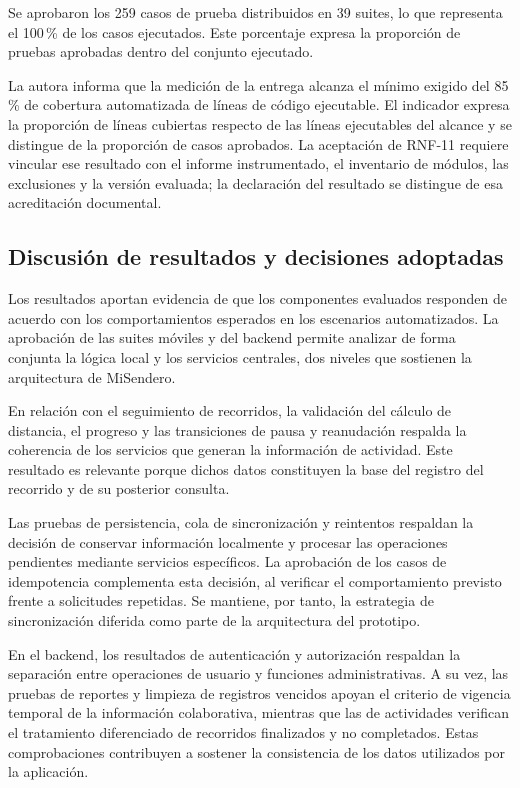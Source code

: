 Se aprobaron los 259 casos de prueba distribuidos en 39 suites, lo que representa el 100\,\% de los casos ejecutados. Este porcentaje expresa la proporción de pruebas aprobadas dentro del conjunto ejecutado.

La autora informa que la medición de la entrega alcanza el mínimo exigido del 85\,\% de cobertura automatizada de líneas de código ejecutable. El indicador expresa la proporción de líneas cubiertas respecto de las líneas ejecutables del alcance y se distingue de la proporción de casos aprobados. La aceptación de RNF-11 requiere vincular ese resultado con el informe instrumentado, el inventario de módulos, las exclusiones y la versión evaluada; la declaración del resultado se distingue de esa acreditación documental.

\subsection{Discusión de resultados y decisiones adoptadas}

Los resultados aportan evidencia de que los componentes evaluados responden de acuerdo con los comportamientos esperados en los escenarios automatizados. La aprobación de las suites móviles y del backend permite analizar de forma conjunta la lógica local y los servicios centrales, dos niveles que sostienen la arquitectura de MiSendero.

En relación con el seguimiento de recorridos, la validación del cálculo de distancia, el progreso y las transiciones de pausa y reanudación respalda la coherencia de los servicios que generan la información de actividad. Este resultado es relevante porque dichos datos constituyen la base del registro del recorrido y de su posterior consulta.

Las pruebas de persistencia, cola de sincronización y reintentos respaldan la decisión de conservar información localmente y procesar las operaciones pendientes mediante servicios específicos. La aprobación de los casos de idempotencia complementa esta decisión, al verificar el comportamiento previsto frente a solicitudes repetidas. Se mantiene, por tanto, la estrategia de sincronización diferida como parte de la arquitectura del prototipo.

En el backend, los resultados de autenticación y autorización respaldan la separación entre operaciones de usuario y funciones administrativas. A su vez, las pruebas de reportes y limpieza de registros vencidos apoyan el criterio de vigencia temporal de la información colaborativa, mientras que las de actividades verifican el tratamiento diferenciado de recorridos finalizados y no completados. Estas comprobaciones contribuyen a sostener la consistencia de los datos utilizados por la aplicación.


